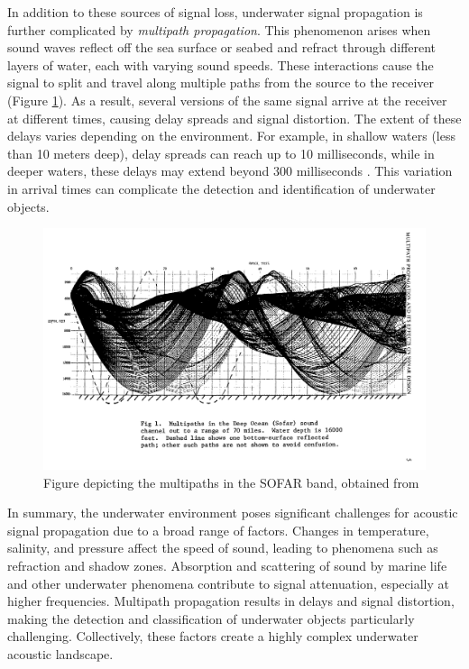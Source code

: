 In addition to these sources of signal loss, underwater signal propagation is further complicated by \textit{multipath propagation}. This phenomenon arises when sound waves reflect off the sea surface or seabed and refract through different layers of water, each with varying sound speeds. These interactions cause the signal to split and travel along multiple paths from the source to the receiver (Figure \ref{fig:multipath}). As a result, several versions of the same signal arrive at the receiver at different times, causing delay spreads and signal distortion. The extent of these delays varies depending on the environment. For example, in shallow waters (less than 10 meters deep), delay spreads can reach up to 10 milliseconds, while in deeper waters, these delays may extend beyond 300 milliseconds \cite{vaccaro_past_1998}. This variation in arrival times can complicate the detection and identification of underwater objects.

\begin{figure}[htbp]
    \centering
    \includegraphics[trim={0 20cm 3cm 0},clip,width=\textwidth]{img/ch2/multipath.png}
    \caption{Figure depicting the multipaths in the SOFAR band, obtained from \cite[Fig. 1]{tacconi_multipath_1977}}
    \label{fig:multipath}
\end{figure}

In summary, the underwater environment poses significant challenges for acoustic signal propagation due to a broad range of factors. Changes in temperature, salinity, and pressure affect the speed of sound, leading to phenomena such as refraction and shadow zones. Absorption and scattering of sound by marine life and other underwater phenomena contribute to signal attenuation, especially at higher frequencies. Multipath propagation results in delays and signal distortion, making the detection and classification of underwater objects particularly challenging. Collectively, these factors create a highly complex underwater acoustic landscape.

